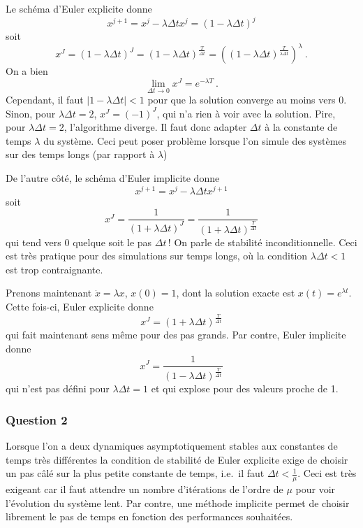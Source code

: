 Le schéma d'Euler explicite donne \[
x^{j+1} = x^j - \lambda{\Delta t}x^j =(1-\lambda{\Delta t})^j
\] soit \[
x^{J} = (1-\lambda{\Delta t})^J = (1-\lambda{\Delta t})^{\frac{T}{{\Delta t}}} = \left((1-\lambda{\Delta t})^{\frac{T}{\lambda{\Delta t}}} \right)^\lambda \ .
\] On a bien \[
\lim_{{\Delta t}\to 0} x^{J} = e^{-\lambda T} \ .
\] Cependant, il faut \(|1-\lambda{\Delta t}|<1\) pour que la solution
converge au moins vers 0. Sinon, pour \(\lambda{\Delta t}= 2\),
\(x^J = (-1)^J\), qui n'a rien à voir avec la solution. Pire, pour
\(\lambda{\Delta t}= 2\), l'algorithme diverge. Il faut donc adapter
\({\Delta t}\) à la constante de temps \(\lambda\) du système. Ceci peut
poser problème lorsque l'on simule des systèmes sur des temps longs (par
rapport à \(\lambda\))

De l'autre côté, le schéma d'Euler implicite donne \[
x^{j+1} = x^j - \lambda{\Delta t}x^{j+1} 
\] soit \[
x^J = \frac{1}{(1+\lambda {\Delta t})^J} =  \frac{1}{(1+\lambda {\Delta t})^\frac{T}{{\Delta t}}}
\] qui tend vers 0 quelque soit le pas \({\Delta t}\)\,! On parle de
stabilité inconditionnelle. Ceci est très pratique pour des simulations
sur temps longs, où la condition \(\lambda{\Delta t}<1\) est trop
contraignante.

Prenons maintenant \(\dot{x}= \lambda x\), \(x(0)=1\), dont la solution
exacte est \(x(t)=e^{\lambda t}\). Cette fois-ci, Euler explicite donne
\[
x^{J} = (1+\lambda{\Delta t})^{\frac{T}{{\Delta t}}}
\] qui fait maintenant sens même pour des pas grands. Par contre, Euler
implicite donne \[
x^J =   \frac{1}{(1-\lambda {\Delta t})^\frac{T}{{\Delta t}}}
\] qui n'est pas défini pour \(\lambda {\Delta t}=1\) et qui explose
pour des valeurs proche de 1.

\hypertarget{ed2-answer-impl-2}{%
\subsubsection*{Question 2}\label{ed2-answer-impl-2}}


Lorsque l'on a deux dynamiques asymptotiquement stables aux constantes
de temps très différentes la condition de stabilité de Euler explicite
exige de choisir un pas câlé sur la plus petite constante de temps,
i.e.~il faut \({\Delta t}<\frac{1}{\mu}\). Ceci est très exigeant car il
faut attendre un nombre d'itérations de l'ordre de \(\mu\) pour voir
l'évolution du système lent. Par contre, une méthode implicite permet de
choisir librement le pas de temps en fonction des performances
souhaitées.

